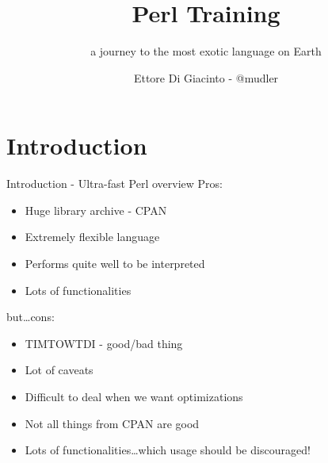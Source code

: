 \documentclass[10pt]{beamer}
\title{Perl Training}
\subtitle{a journey to the most exotic language on Earth}
\date{}
\author{Ettore Di Giacinto - @mudler}
\institute{SUSE}
\begin{document}
\maketitle
\begin{frame}[fragile]
\end{frame}

\section{Introduction}
\begin{frame}[fragile]{Introduction - Ultra-fast Perl overview}
    Pros:
  \begin{itemize}
      \item Huge library archive - CPAN
      \item Extremely flexible language
      \item Performs quite well to be interpreted
      \item Lots of functionalities
  \end{itemize}
  
  but\ldots cons:
  
    \begin{itemize}
      \item TIMTOWTDI - good/bad thing
      \item Lot of caveats
      \item Difficult to deal when we want optimizations
      \item Not all things from CPAN are good
      \item Lots of functionalities\ldots which usage should be discouraged!
  \end{itemize}
\end{frame}
\end{document}

